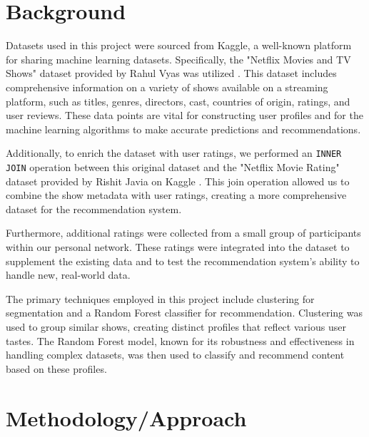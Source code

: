 \documentclass[sigconf]{acmart}
\begin{document}
	\section{Background}
	Datasets used in this project were sourced from Kaggle, a well-known platform for sharing machine learning datasets. Specifically, the "Netflix Movies and TV Shows" dataset provided by Rahul Vyas was utilized \cite{kaggle_dataset}. This dataset includes comprehensive information on a variety of shows available on a streaming platform, such as titles, genres, directors, cast, countries of origin, ratings, and user reviews. These data points are vital for constructing user profiles and for the machine learning algorithms to make accurate predictions and recommendations.
	
	Additionally, to enrich the dataset with user ratings, we performed an \texttt{INNER JOIN} operation between this original dataset and the "Netflix Movie Rating" dataset provided by Rishit Javia on Kaggle \cite{netflix_ratings}. This join operation allowed us to combine the show metadata with user ratings, creating a more comprehensive dataset for the recommendation system.
	
	Furthermore, additional ratings were collected from a small group of participants within our personal network. These ratings were integrated into the dataset to supplement the existing data and to test the recommendation system's ability to handle new, real-world data.
	
	The primary techniques employed in this project include clustering for segmentation and a Random Forest classifier for recommendation. Clustering was used to group similar shows, creating distinct profiles that reflect various user tastes. The Random Forest model, known for its robustness and effectiveness in handling complex datasets, was then used to classify and recommend content based on these profiles.
	\section{Methodology/Approach}
\end{document}
